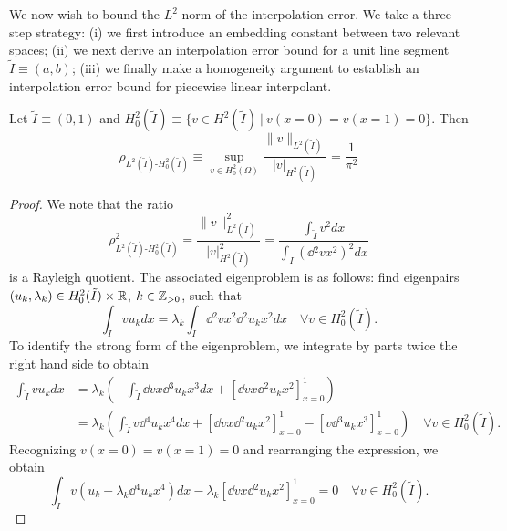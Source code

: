 We now wish to bound the $L^2$ norm of the interpolation error. We take a three-step strategy: (i) we first introduce an embedding constant between two relevant spaces; (ii) we next derive an interpolation error bound for a unit line segment $\tilde I \equiv (a,b)$; (iii) we finally make a homogeneity argument to establish an interpolation error bound for piecewise linear interpolant.
\begin{lemma}
  \label{lemma:th_l2_h2_embed}
  Let $\tilde I \equiv (0,1)$ and $H^2_0(\tilde I) \equiv \{ v \in H^2(\tilde I) \ | \ v(x=0) = v(x=1) = 0 \}$. Then 
  \begin{equation*}
    \rho_{L^2(\tilde I)\text{-}H^2_0(\tilde I)} \equiv \sup_{v \in H^2_0(\Omega)} \frac{\| v \|_{L^2(\tilde I)}}{| v |_{H^2(\tilde I)}} = \frac{1}{\pi^2}
  \end{equation*}
  \begin{proof}
    We note that the ratio
    \begin{equation*}
       \rho_{L^2(\tilde I)\text{-}H^2_0(\tilde I)}^2 = \frac{\| v \|_{L^2(\tilde I)}^2}{|v|_{H^2(\tilde I)}^2}
      = \frac{\int_{\tilde I} v^2 dx}{\int_{\tilde I} (\dd{^2v}{x^2})^2 dx}
    \end{equation*}
    is a Rayleigh quotient.  The associated eigenproblem is as follows: find eigenpairs $(u_k, \lambda_k) \in H^2_0(\tilde I) \times \mathbb{R}$, $k \in \mathbb{Z}_{>0}$, such that
    \begin{equation*}
      \int_{\tilde I} v u_k dx = \lambda_k \int_{\tilde I} \dd{^2v}{x^2}\dd{^2u_k}{x^2}dx \quad \forall v \in H^2_0(\tilde I).
    \end{equation*}
    To identify the strong form of the eigenproblem, we integrate by parts twice the right hand side to obtain
    \begin{align*}
      \int_{\tilde I} v u_k dx
      &=
      \lambda_k \left( -\int_{\tilde I} \dd{v}{x} \dd{^3u_k}{x^3}dx  + [\dd{v}{x} \dd{^2u_k}{x^2}]_{x=0}^1 \right) %
      \\
      &=\lambda_k \left( \int_{\tilde I} v \dd{^4u_k}{x^4}dx  + [\dd{v}{x} \dd{^2u_k}{x^2}]_{x=0}^1 - [v \dd{^3u_k}{x^3}]_{x=0}^1 \right) \quad \forall v \in H^2_0(\tilde I).
    \end{align*}
    Recognizing $v(x=0) = v(x=1) = 0$ and rearranging the expression, we obtain
    \begin{equation*}
      \int_{I} v(u_k - \lambda_k \dd{^4u_k}{x^4}) dx - \lambda_k[\dd{v}{x} \dd{^2u_k}{x^2}]_{x=0}^1 = 0 \quad \forall v \in H^2_0(\tilde I).

\end{equation*}
\end{proof}
\end{lemma}
